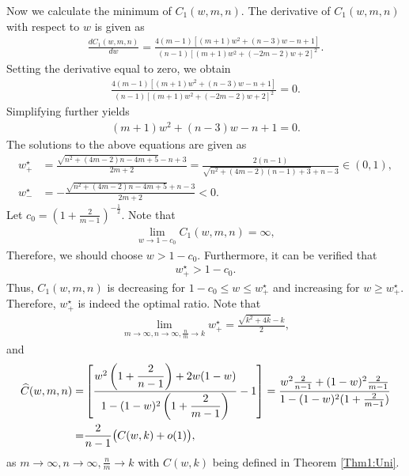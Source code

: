 Now we calculate the minimum of $C_1(w,m,n)$. The derivative of \( C_1(w,m,n) \) with respect to \( w \) is given as
\begin{align*}
\frac{d C_1(w,m,n)}{dw} = \frac{4 (m - 1) \left[ (m + 1) w^{2} + (n - 3) w - n + 1 \right]}{(n - 1) \left[ (m + 1) w^{2} + (-2m - 2) w + 2 \right]^{2}}.
\end{align*}
Setting the derivative equal to zero, we obtain
\begin{align*}
\frac{4 (m - 1) \left[ (m + 1) w^{2} + (n - 3) w - n + 1 \right]}{(n - 1) \left[ (m + 1) w^{2} + (-2m - 2) w + 2 \right]^{2}} = 0.
\end{align*}
Simplifying further yields
\begin{align*}
(m + 1) w^{2} + (n - 3) w - n + 1 = 0.
\end{align*}
The solutions to the above equations are given as
\begin{align*}
w^{\star}_+ &= \frac{\sqrt{n^{2} + (4m - 2) n - 4m + 5} - n + 3}{2m + 2} = \frac{2(n-1)}{\sqrt{n^2 + (4m - 2)(n-1) + 3} + n - 3} \in (0,1), \\
w^{\star}_- &= -\frac{\sqrt{n^{2} + (4m - 2) n - 4m + 5} + n - 3}{2m + 2} < 0.
\end{align*}
Let $c_0 = \left(1+\frac{2}{m-1}\right)^{-\frac{1}{2}}$. Note that
\begin{align*}
\lim_{w \rightarrow 1 - c_0} C_1(w,m,n) = \infty,
\end{align*}
Therefore, we should choose $w>1 -c_0$. Furthermore, it can be verified that
\begin{align*}
w^{\star}_+ > 1 - c_0.
\end{align*}
Thus, \( C_1(w,m,n) \) is decreasing for \( 1 - c_0 \leq w \leq w^{\star}_+ \) and increasing for \( w \geq w^{\star}_+ \). Therefore, \( w^{\star}_+ \) is indeed the optimal ratio. Note that 
\begin{align}
\label{lim_optimal_ratio_uni_var}
\lim_{m\to \infty, n\to \infty ,\frac
{n}{m}\to k} w^{\star}_{+} 
= \frac{\sqrt{k^2+4k}-k}{2},
\end{align}
and \begin{align}
\label{limit_loss_function_uni_var}
\widehat{C}(w,m,n)=&\left[\dfrac{w^2\left(1 + \dfrac{2}{n-1}\right) + 2w(1-w)}{1 - (1-w)^2\left(1+\dfrac{2}{m-1}\right)} - 1 \right] =\frac{w^2 \frac{2}{n-1}+{(1-w)^2}{\frac{2}{m-1}} }{1-(1-w)^2(1+\frac{2}{m-1})} \notag \\
=&\frac{2}{n-1}\big(C (w,k) + o(1) \big),
\end{align}
as $m \xrightarrow{} \infty, n\xrightarrow{} \infty, \frac{n}{m}\xrightarrow{}k$ with $C(w,k)$ being defined in Theorem \ref{Thm1:Uni}.

